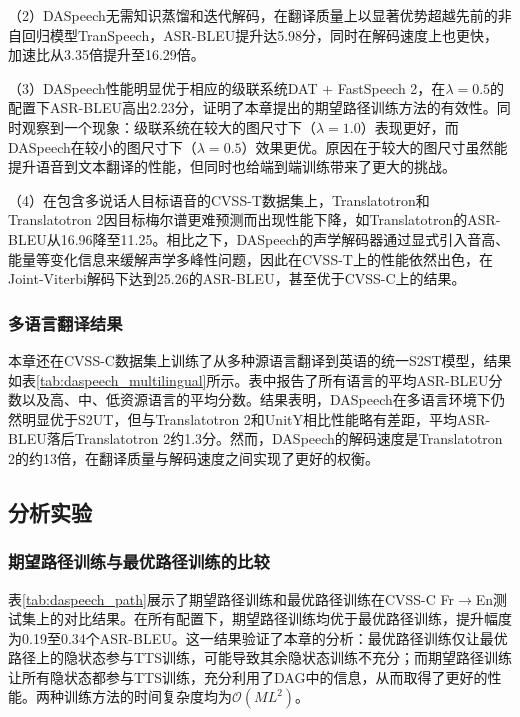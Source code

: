 （2）DASpeech无需知识蒸馏和迭代解码，在翻译质量上以显著优势超越先前的非自回归模型TranSpeech，ASR-BLEU提升达5.98分，同时在解码速度上也更快，加速比从3.35倍提升至16.29倍。

（3）DASpeech性能明显优于相应的级联系统DAT + FastSpeech 2，在$\lambda=0.5$的配置下ASR-BLEU高出2.23分，证明了本章提出的期望路径训练方法的有效性。同时观察到一个现象：级联系统在较大的图尺寸下（$\lambda=1.0$）表现更好，而DASpeech在较小的图尺寸下（$\lambda=0.5$）效果更优。原因在于较大的图尺寸虽然能提升语音到文本翻译的性能，但同时也给端到端训练带来了更大的挑战。

（4）在包含多说话人目标语音的CVSS-T数据集上，Translatotron和Translatotron 2因目标梅尔谱更难预测而出现性能下降，如Translatotron的ASR-BLEU从16.96降至11.25。相比之下，DASpeech的声学解码器通过显式引入音高、能量等变化信息来缓解声学多峰性问题，因此在CVSS-T上的性能依然出色，在Joint-Viterbi解码下达到25.26的ASR-BLEU，甚至优于CVSS-C上的结果。

\subsubsection{多语言翻译结果}



本章还在CVSS-C数据集上训练了从多种源语言翻译到英语的统一S2ST模型，结果如表\ref{tab:daspeech_multilingual}所示。表中报告了所有语言的平均ASR-BLEU分数以及高、中、低资源语言的平均分数。结果表明，DASpeech在多语言环境下仍然明显优于S2UT，但与Translatotron 2和UnitY相比性能略有差距，平均ASR-BLEU落后Translatotron 2约1.3分。然而，DASpeech的解码速度是Translatotron 2的约13倍，在翻译质量与解码速度之间实现了更好的权衡。


\subsection{分析实验}

\subsubsection{期望路径训练与最优路径训练的比较}



表\ref{tab:daspeech_path}展示了期望路径训练和最优路径训练在CVSS-C Fr$\rightarrow$En测试集上的对比结果。在所有配置下，期望路径训练均优于最优路径训练，提升幅度为0.19至0.34个ASR-BLEU。这一结果验证了本章的分析：最优路径训练仅让最优路径上的隐状态参与TTS训练，可能导致其余隐状态训练不充分；而期望路径训练让所有隐状态都参与TTS训练，充分利用了DAG中的信息，从而取得了更好的性能。两种训练方法的时间复杂度均为$\mathcal{O}(ML^2)$。

